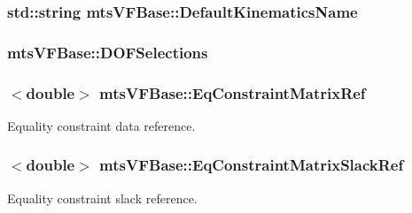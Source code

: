 \subsubsection[{Default\+Kinematics\+Name}]{\setlength{\rightskip}{0pt plus 5cm}std\+::string mts\+V\+F\+Base\+::\+Default\+Kinematics\+Name\hspace{0.3cm}{\ttfamily [static]}}\label{classmts_v_f_base_a0e57cd2efaf96320f7bcceb6964cebe8}
\hypertarget{classmts_v_f_base_a5b1e01809d1f9f8486e5c582e651f1e5}{}
\subsubsection[{D\+O\+F\+Selections}]{ mts\+V\+F\+Base\+::\+D\+O\+F\+Selections}\label{classmts_v_f_base_a5b1e01809d1f9f8486e5c582e651f1e5}
\hypertarget{classmts_v_f_base_a2e4890accf54786167b72ab807a6c9d9}{}
\subsubsection[{Eq\+Constraint\+Matrix\+Ref}]{$<$double$>$ mts\+V\+F\+Base\+::\+Eq\+Constraint\+Matrix\+Ref}\label{classmts_v_f_base_a2e4890accf54786167b72ab807a6c9d9}


Equality constraint data reference. 

\hypertarget{classmts_v_f_base_afba44d1e55c4d6a1885b80f19007a3fa}{}
\subsubsection[{Eq\+Constraint\+Matrix\+Slack\+Ref}]{$<$double$>$ mts\+V\+F\+Base\+::\+Eq\+Constraint\+Matrix\+Slack\+Ref}\label{classmts_v_f_base_afba44d1e55c4d6a1885b80f19007a3fa}


Equality constraint slack reference. 


